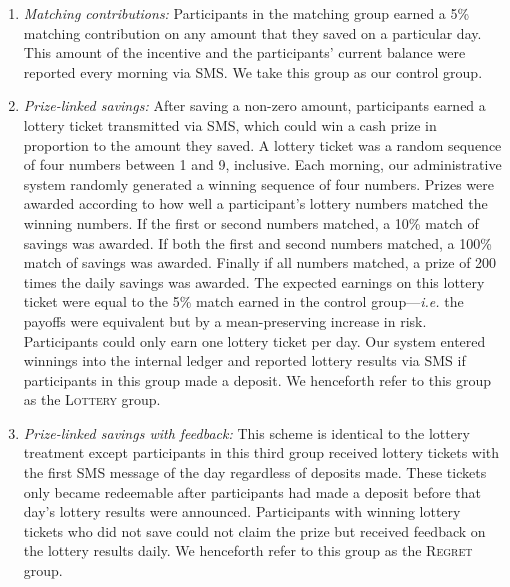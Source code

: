 \documentclass[12pt]{article}
\begin{document}
		\begin{enumerate} \setlength{\itemsep}{1pt}

			\item \textit{Matching contributions:} Participants in the matching group earned a 5\% matching contribution on any amount that they saved on a particular day. This amount of the incentive and the participants' current balance were reported every morning via SMS. We take this group as our control group.

			\item \textit{Prize-linked savings:} After saving a non-zero amount, participants earned a lottery ticket transmitted via SMS, which could win a cash prize in proportion to the amount they saved. A lottery ticket was a random sequence of four numbers between 1 and 9, inclusive. Each morning, our administrative system randomly generated a winning sequence of four numbers. Prizes were awarded according to how well a participant's lottery numbers matched the winning numbers. If the first or second numbers matched, a 10\% match of savings was awarded. If both the first and second numbers matched, a 100\% match of savings was awarded. Finally if all numbers matched, a prize of 200 times the daily savings was awarded. The expected earnings on this lottery ticket were equal to the 5\% match earned in the control group---\textit{i.e.} the payoffs were equivalent but by a mean-preserving increase in risk. Participants could only earn one lottery ticket per day. Our system entered winnings into the internal ledger and reported lottery results via SMS if participants in this group made a deposit. We henceforth refer to this group as the \textsc{Lottery} group.

			\item \textit{Prize-linked savings with feedback:} This scheme is identical to the lottery treatment except participants in this third group received lottery tickets with the first SMS message of the day regardless of deposits made. These tickets only became redeemable after participants had made a deposit before that day's lottery results were announced. Participants with winning lottery tickets who did not save could not claim the prize but received feedback on the lottery results daily. We henceforth refer to this group as the \textsc{Regret} group.

		\end{enumerate}

		

		\clearpage
\end{document}
